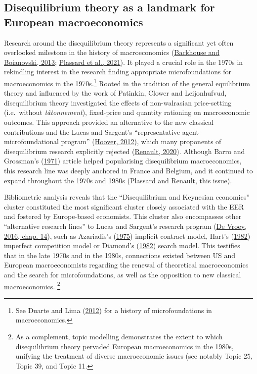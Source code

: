 \documentclass[
  12pt,
  onecolumn]{article}
\begin{document}
\hypertarget{disequilibrium}{%
\subsection{Disequilibrium theory as a landmark for European
macroeconomics}\label{disequilibrium}}

Research around the disequilibrium theory represents a significant yet
often overlooked milestone in the history of macroeconomics
(\protect\hyperlink{ref-backhouseboianovski2013}{Backhouse and
Boianovski, 2013}; \protect\hyperlink{ref-plassard2021}{Plassard et al.,
2021}). It played a crucial role in the 1970s in rekindling interest in
the research finding appropriate microfoundations for macroeconomics in
the 1970s.\footnote{See Duarte and Lima
  (\protect\hyperlink{ref-duartelima2012a}{2012}) for a history of
  microfoundations in macroeconomics.} Rooted in the tradition of the
general equilibrium theory and influenced by the work of Patinkin,
Clower and Leijonhufvud, disequilibrium theory investigated the effects
of non-walrasian price-setting (i.e.~without \emph{tâtonnement}),
fixed-price and quantity rationing on macroeconomic outcomes. This
approach provided an alternative to the new classical contributions and
the Lucas and Sargent's ``representative-agent microfoundational
program'' (\protect\hyperlink{ref-hoover2012}{Hoover, 2012}), which many
proponents of disequilibrium research explicitly rejected
(\protect\hyperlink{ref-renault2020a}{Renault, 2020}). Although Barro
and Grossman's (\protect\hyperlink{ref-barro1971}{1971}) article helped
popularising disequilibrium macroeconomics, this research line was
deeply anchored in France and Belgium, and it continued to expand
throughout the 1970s and 1980s (Plassard and Renault, this issue).

Bibliometric analysis reveals that the ``Disequilibrium and Keynesian
economics'' cluster constituted the most significant cluster closely
associated with the EER and fostered by Europe-based economists. This
cluster also encompasses other ``alternative research lines'' to Lucas
and Sargent's research program (\protect\hyperlink{ref-devroey2016}{De
Vroey, 2016, chap. 14}), such as Azariadis's
(\protect\hyperlink{ref-azariadis1975}{1975}) implicit contract model,
Hart's (\protect\hyperlink{ref-hart1982}{1982}) imperfect competition
model or Diamond's (\protect\hyperlink{ref-diamond1982}{1982}) search
model. This testifies that in the late 1970s and in the 1980s,
connections existed between US and European macroeconomists regarding
the renewal of theoretical macroeconomics and the search for
microfoundations, as well as the opposition to new classical
macroeconomics. \footnote{As a complement, topic modelling demonstrates
  the extent to which disequilibrium theory pervaded European
  macroeconomics in the 1980s, unifying the treatment of diverse
  macroeconomic issues (see notably Topic 25, Topic 39, and Topic 11.}
\end{document}
